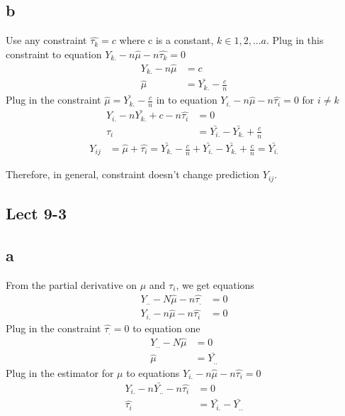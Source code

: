 \documentclass[11pt,letterpaper]{article}
\begin{document}
\subsection*{b}
\noindent Use any constraint $\hat{\tau_k} = c$ where c is a constant, $k \in 1, 2, ... a$. Plug in this constraint to equation $Y_{k.} - n \hat{\mu} - n \hat{\tau_k} = 0$
\begin{align*}
Y_{k.}  - n \hat{\mu} &= c \\
\hat{\mu} &= \bar{Y_{k.}} - \frac{c}{n}
\end{align*}
\noindent Plug in the constraint $\hat{\mu} = \bar{Y_{k.}} - \frac{c}{n}$ in to equation $Y_{i.} - n \hat{\mu} - n\hat{\tau_i} = 0$ for $i \neq k$
\begin{align*}
Y_{i.} - n \bar{Y_{k.}} + c - n \hat{\tau_i} &= 0 \\
\tau_i &= \bar{Y_{i.}} - \bar{Y_{k.}} + \frac{c}{n}
\end{align*}
\begin{align*}
Y_{ij} &= \hat{\mu} + \hat{\tau_i} = \bar{Y_{k.}} - \frac{c}{n} + \bar{Y_{i.}} - \bar{Y_{k.}} + \frac{c}{n} = \bar{Y_{i.}} 
\end{align*}

\noindent Therefore, in general, constraint doesn't change prediction $Y_{ij}$. 

\subsection*{Lect 9-3}
\subsection*{a}
\noindent From the partial derivative on $\mu$ and $\tau_i$, we get equations 
\begin{align*}
Y_{..} - N \hat{\mu} - n\hat{\tau_.} &= 0 \\
Y_{i.} - n \hat{\mu} - n\hat{\tau_i} &= 0
\end{align*}
\noindent Plug in the constraint $\hat{\tau_.} = 0$ to equation one
\begin{align*}
Y_{..} - N \hat{\mu} &= 0 \\
\hat{\mu} &= \bar{Y_{..}}
\end{align*}
\noindent Plug in the estimator for $\mu$ to equations $Y_{i.} - n \hat{\mu} - n\hat{\tau_i} = 0$
\begin{align*}
Y_{i.} - n\bar{Y_{..}} - n\hat{\tau_i} &= 0 \\
\hat{\tau_i} &= \bar{Y_{i.}} - \bar{Y_{..}}
\end{align*}
\end{document}
